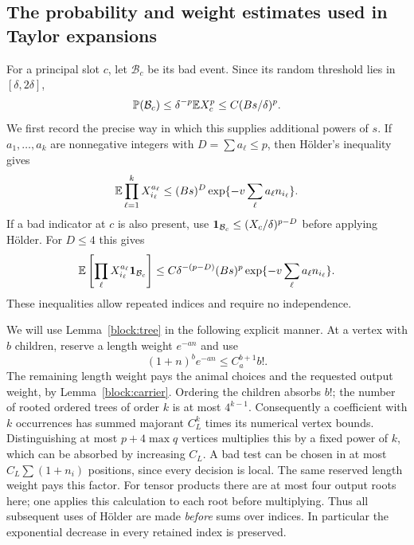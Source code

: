 \subsection{The probability and weight estimates used in Taylor expansions}
For a principal slot $c$, let $\mathcal B_c$ be its bad event.  Since its
random threshold lies in $[\delta,2\delta]$,
\begin{equation}\label{norm:badprob}
 \mathbb P(\mathcal B_c)\le \delta^{-p}\mathbb E X_c^p\le C(Bs/\delta)^p.
\end{equation}
We first record the precise way in which this supplies additional powers
of $s$.  If $a_1,\ldots,a_k$ are nonnegative integers with
$D=\sum a_\ell\le p$, then H\"older's inequality gives
\begin{equation}\label{norm:product}
 \mathbb E\prod_{\ell=1}^k X_{i_\ell}^{a_\ell}
 \le (Bs)^D\exp\{-v\sum_\ell a_\ell n_{i_\ell}\}.
\end{equation}
If a bad indicator at $c$ is also present, use
$\mathbf 1_{\mathcal B_c}\le(X_c/\delta)^{p-D}$ before applying H\"older.
For $D\le4$ this gives
\begin{equation}\label{norm:flagproduct}
 \mathbb E\left[\prod_\ell X_{i_\ell}^{a_\ell}
                  \mathbf 1_{\mathcal B_c}\right]
 \le C\delta^{-(p-D)}(Bs)^p
       \exp\{-v\sum_\ell a_\ell n_{i_\ell}\}.
\end{equation}
These inequalities allow repeated indices and require no independence.

We will use Lemma~\ref{block:tree} in the following explicit manner.
At a vertex with $b$ children, reserve a length weight $e^{-a n}$ and use
\[
 (1+n)^b e^{-a n}\le C_a^{b+1}b!.
\]
The remaining length weight pays the animal choices and the requested
output weight, by Lemma~\ref{block:carrier}.  Ordering the children
absorbs $b!$; the number of rooted ordered trees of order $k$ is at most
$4^{k-1}$.  Consequently a coefficient with $k$ occurrences has summed
majorant $C_L^k$ times its numerical vertex bounds.  Distinguishing at
most $p+4\max q$ vertices multiplies this by a fixed power of $k$, which
can be absorbed by increasing $C_L$.  A bad test can be chosen in at most
$C_L\sum(1+n_i)$ positions, since every decision is local.  The same
reserved length weight pays this factor.  For tensor products there are
at most four output roots here; one applies this calculation to each
root before multiplying.  Thus all subsequent uses of H\"older are made
\emph{before} sums over indices.  In particular the exponential decrease
in every retained index is preserved.

